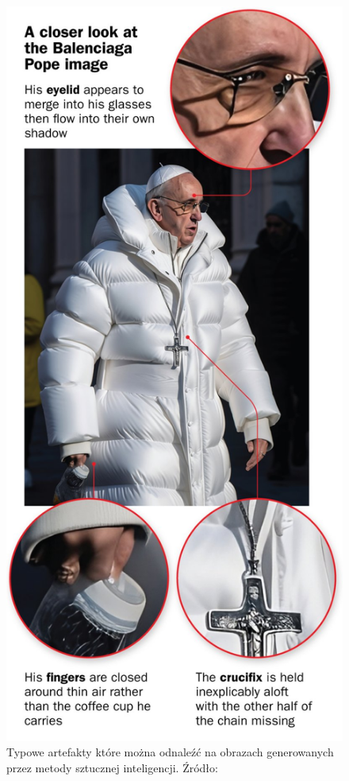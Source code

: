 \begin{figure}
    \includegraphics[width=\linewidth]{img/Pope-annotation}
    \centering
    \caption{ Typowe artefakty które można odnaleźć na obrazach generowanych przez metody sztucznej inteligencji. Źródło:~\cite{howToSpotBalenciagaPope} }
    \label{img:pope_annotation}
\end{figure}

